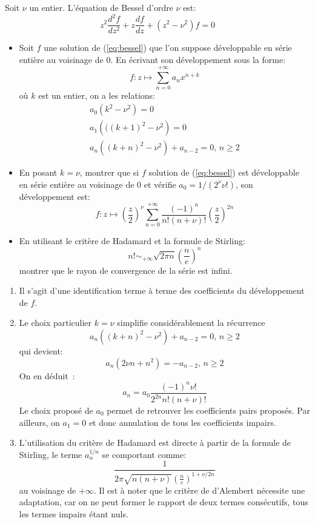 \documentclass[a4paper, 12pt]{amsart}
\begin{document}
\begin{fex}
Soit $\nu$ un entier. L'équation de Bessel d'ordre $\nu$ est:
\begin{equation}\label{eq:bessel}
z^2 \frac{d^2f}{dz^2} + z \frac{df}{dz} + \left(z^2-\nu^2\right)f = 0
\end{equation}
\begin{itemize}
\item Soit $f$ une solution de (\ref{eq:bessel}) que l'on suppose développable en série entière au voisinage de $0$. En écrivant son développement sous la forme:
\[
f \colon z \mapsto \sum_{n=0}^{+\infty} a_n x^{n+k}
\]
où $k$ est un entier, on a les relations:
\begin{eqnarray}
a_0 \left(k^2 - \nu^2\right) = 0 \\
a_1 \left(((k+1)^2 - \nu^2\right) = 0 \\
a_n \left((k+n)^2 - \nu^2\right) + a_{n-2} = 0, \, n \geq 2
\end{eqnarray}
\item En posant $k = \nu$, montrer que si $f$ solution de (\ref{eq:bessel}) est développable en série entière au voisinage de $0$ et vérifie $a_0=1/(2^\nu \nu!)$, son développement est:
\[
f \colon z \mapsto \left(\frac{z}{2}\right)^\nu \sum_{n=0}^{+\infty} \frac{(-1)^n}{n!(n+\nu)!}\left(\frac{z}{2}\right)^{2n}
\]
\item En utilisant le critère de Hadamard et la formule de Stirling:
\[
n! \sim_{+\infty} \sqrt{2 \pi n}\left(\frac{n}{e}\right)^n
\]
montrer que le rayon de convergence de la série est infini.
\end{itemize}
\end{fex}
\begin{enumerate}
\item Il s'agit d'une identification terme à terme des coefficients du développement de $f$.
\item Le choix particulier $k = \nu$ simplifie considérablement la récurrence
\[
a_n \left((k+n)^2 - \nu^2\right) + a_{n-2} = 0, \, n \geq 2
\]
qui devient:
\[
a_n \left(2\nu n + n^2\right) = - a_{n-2}, \, n \geq 2
\]
On en déduit~:
\[
a_n = a_0 \frac{(-1)^n\nu!}{2^{2n}n!(n+\nu)!}
\]
Le choix proposé de $a_0$ permet de retrouver les coefficients pairs proposés. Par ailleurs, on $a_1 =0$ et donc annulation de tous les coefficients impairs.
\item L'utilisation du critère de Hadamard est directe à partir de la formule de Stirling, le terme $a_n^{1/n}$ se comportant comme:
\[
\frac{1}{2\pi \sqrt{n(n+\nu)}\left(\frac{n}{e}\right)^{1+ \nu/2n}}
\]
au voisinage de $+\infty$. Il est à noter que le critère de d'Alembert nécessite une adaptation, car on ne peut former le rapport de deux termes consécutifs, tous les termes impairs étant nuls. 
\end{enumerate}
\end{document}
